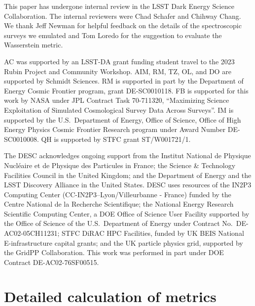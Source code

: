 \documentclass[fleqn,usenatbib,useAMS]{mnras}
\newcommand{\PersonalTag}[3]{{\color{#2}{$^{#1}$ [#3}]}}
\newcommand{\aim}[1]{\PersonalTag{Alex}{violet}{#1}}
\newcommand{\rachel}[1]{\PersonalTag{Rachel}{orange}{#1}}
\newcommand{\cwr}[1]{{\color{black}{#1}}}
\begin{document}

This paper has undergone internal review in the LSST Dark Energy Science Collaboration. %
The internal reviewers were Chad Schafer and Chihway Chang. %
We thank Jeff Newman for helpful feedback on the details of the spectroscopic surveys we emulated and Tom Loredo for the suggestion to evaluate the Wasserstein metric. \cwr{We also thank Roberto Trotta for helpful feedback on the manuscript.}

AC was supported by an LSST-DA grant funding student travel to the 2023 Rubin Project and Community Workshop.
AIM, RM, TZ, OL, and DO are supported by Schmidt Sciences. 
RM is supported in part by the Department of Energy Cosmic Frontier program, grant DE-SC0010118. FB is supported for this work by NASA under JPL Contract Task 70-711320, ``Maximizing Science Exploitation of Simulated Cosmological Survey Data Across Surveys''. IM is supported by the U.S.\ Department of Energy, Office of Science, Office of High Energy Physics Cosmic Frontier Research program under Award Number DE-SC0010008.  QH is supported by STFC grant ST/W001721/1.

The DESC acknowledges ongoing support from the Institut National de 
Physique Nucl\'eaire et de Physique des Particules in France; the 
Science \& Technology Facilities Council in the United Kingdom; and the
Department of Energy and the LSST Discovery Alliance
in the United States.  DESC uses resources of the IN2P3 
Computing Center (CC-IN2P3--Lyon/Villeurbanne - France) funded by the 
Centre National de la Recherche Scientifique; the National Energy 
Research Scientific Computing Center, a DOE Office of Science User 
Facility supported by the Office of Science of the U.S.\ Department of
Energy under Contract No.\ DE-AC02-05CH11231; STFC DiRAC HPC Facilities, 
funded by UK BEIS National E-infrastructure capital grants; and the UK 
particle physics grid, supported by the GridPP Collaboration.  This 
work was performed in part under DOE Contract DE-AC02-76SF00515.

{}



\appendix

\section{Detailed calculation of metrics}\label{app:metrics}
\end{document}
